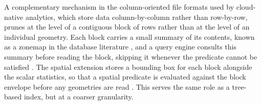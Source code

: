 A complementary mechanism in the column-oriented file formats used by cloud-native analytics, which store data column-by-column rather than row-by-row, prunes at the level of a contiguous block of rows rather than at the level of an individual geometry. Each block carries a small summary of its contents, known as a zonemap in the database literature \parencite{moerkotte1998_small_materialized_aggregates}, and a query engine consults this summary before reading the block, skipping it whenever the predicate cannot be satisfied \parencite{lamb2022_querying_parquet_millisecond_latency}. The spatial extension stores a bounding box for each block alongside the scalar statistics, so that a spatial predicate is evaluated against the block envelope before any geometries are read \parencite{ogc2024_geoparquet_specification_v110}. This serves the same role as a tree-based index, but at a coarser granularity.